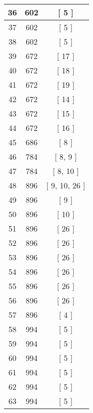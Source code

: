 \begin{center}
\begin{longtable}[H]{|| c c c ||}
36 & 602 & [ 5 ] \\ 
\hline
37 & 602 & [ 5 ] \\ 
\hline
38 & 602 & [ 5 ] \\ 
\hline
39 & 672 & [ 17 ] \\ 
\hline
40 & 672 & [ 18 ] \\ 
\hline
41 & 672 & [ 19 ] \\ 
\hline
42 & 672 & [ 14 ] \\ 
\hline
43 & 672 & [ 15 ] \\ 
\hline
44 & 672 & [ 16 ] \\ 
\hline
45 & 686 & [ 8 ] \\ 
\hline
46 & 784 & [ 8, 9 ] \\ 
\hline
47 & 784 & [ 8, 10 ] \\ 
\hline
48 & 896 & [ 9, 10, 26 ] \\ 
\hline
49 & 896 & [ 9 ] \\ 
\hline
50 & 896 & [ 10 ] \\ 
\hline
51 & 896 & [ 26 ] \\ 
\hline
52 & 896 & [ 26 ] \\ 
\hline
53 & 896 & [ 26 ] \\ 
\hline
54 & 896 & [ 26 ] \\ 
\hline
55 & 896 & [ 26 ] \\ 
\hline
56 & 896 & [ 26 ] \\ 
\hline
57 & 896 & [ 4 ] \\ 
\hline
58 & 994 & [ 5 ] \\ 
\hline
59 & 994 & [ 5 ] \\ 
\hline
60 & 994 & [ 5 ] \\ 
\hline
61 & 994 & [ 5 ] \\ 
\hline
62 & 994 & [ 5 ] \\ 
\hline
63 & 994 & [ 5 ] \\ 
\hline
\end{longtable}
\end{center}
